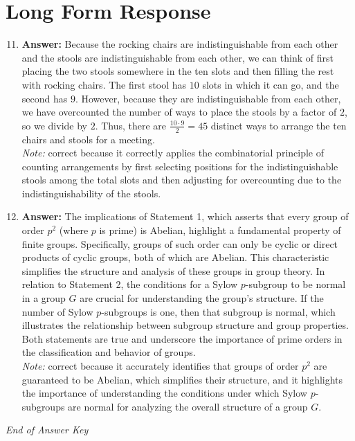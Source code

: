 \documentclass[12pt]{article}
\begin{document}
\section*{Long Form Response}
\begin{enumerate}[label=\arabic*.]
\setcounter{enumi}{10}
\item \textbf{Answer:} Because the rocking chairs are indistinguishable from each other and the stools are indistinguishable from each other, we can think of first placing the two stools somewhere in the ten slots and then filling the rest with rocking chairs. The first stool has $10$ slots in which it can go, and the second has $9$. However, because they are indistinguishable from each other, we have overcounted the number of ways to place the stools by a factor of $2$, so we divide by $2$. Thus, there are $\frac{10 \cdot 9}{2} = \boxed{45}$ distinct ways to arrange the ten chairs and stools for a meeting.
\\ \textit{Note:} correct because it correctly applies the combinatorial principle of counting arrangements by first selecting positions for the indistinguishable stools among the total slots and then adjusting for overcounting due to the indistinguishability of the stools.
\item \textbf{Answer:} The implications of Statement 1, which asserts that every group of order \( p^2 \) (where \( p \) is prime) is Abelian, highlight a fundamental property of finite groups. Specifically, groups of such order can only be cyclic or direct products of cyclic groups, both of which are Abelian. This characteristic simplifies the structure and analysis of these groups in group theory. In relation to Statement 2, the conditions for a Sylow \( p \)-subgroup to be normal in a group \( G \) are crucial for understanding the group's structure. If the number of Sylow \( p \)-subgroups is one, then that subgroup is normal, which illustrates the relationship between subgroup structure and group properties. Both statements are true and underscore the importance of prime orders in the classification and behavior of groups.
\\ \textit{Note:} correct because it accurately identifies that groups of order \( p^2 \) are guaranteed to be Abelian, which simplifies their structure, and it highlights the importance of understanding the conditions under which Sylow \( p \)-subgroups are normal for analyzing the overall structure of a group \( G \).
\end{enumerate}

\vfill
\noindent\textit{End of Answer Key}
\end{document}
